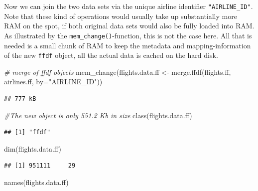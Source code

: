 \documentclass[
  12pt,
]{style/krantz}
\newenvironment{Shaded}{\begin{snugshade}}{\end{snugshade}}
\newcommand{\AttributeTok}[1]{\textcolor[rgb]{0.77,0.63,0.00}{#1}}
\newcommand{\CommentTok}[1]{\textcolor[rgb]{0.56,0.35,0.01}{\textit{#1}}}
\newcommand{\FunctionTok}[1]{\textcolor[rgb]{0.00,0.00,0.00}{#1}}
\newcommand{\NormalTok}[1]{#1}
\newcommand{\OtherTok}[1]{\textcolor[rgb]{0.56,0.35,0.01}{#1}}
\newcommand{\StringTok}[1]{\textcolor[rgb]{0.31,0.60,0.02}{#1}}
\begin{document}
Now we can join the two data sets via the unique airline identifier \texttt{"AIRLINE\_ID"}. Note that these kind of operations would usually take up substantially more RAM on the spot, if both original data sets would also be fully loaded into RAM. As illustrated by the \texttt{mem\_change()}-function, this is not the case here. All that is needed is a small chunk of RAM to keep the metadata and mapping-information of the new \texttt{ffdf} object, all the actual data is cached on the hard disk.

\begin{Shaded}
\begin{Highlighting}[]
\CommentTok{\# merge of ffdf objects}
\FunctionTok{mem\_change}\NormalTok{(flights.data.ff }\OtherTok{\textless{}{-}} \FunctionTok{merge.ffdf}\NormalTok{(flights.ff, airlines.ff, }\AttributeTok{by=}\StringTok{"AIRLINE\_ID"}\NormalTok{))}
\end{Highlighting}
\end{Shaded}

\begin{verbatim}
## 777 kB
\end{verbatim}

\begin{Shaded}
\begin{Highlighting}[]
\CommentTok{\#The new object is only 551.2 Kb in size}
\FunctionTok{class}\NormalTok{(flights.data.ff)}
\end{Highlighting}
\end{Shaded}

\begin{verbatim}
## [1] "ffdf"
\end{verbatim}

\begin{Shaded}
\begin{Highlighting}[]
\FunctionTok{dim}\NormalTok{(flights.data.ff)}
\end{Highlighting}
\end{Shaded}

\begin{verbatim}
## [1] 951111     29
\end{verbatim}

\begin{Shaded}
\begin{Highlighting}[]
\FunctionTok{names}\NormalTok{(flights.data.ff)}
\end{Highlighting}
\end{Shaded}
\end{document}
